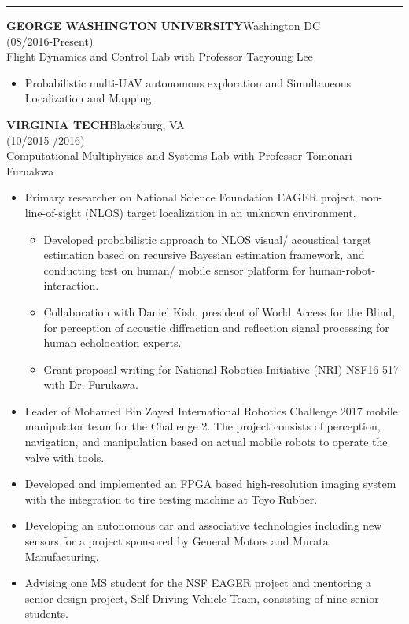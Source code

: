 \documentclass[11pt,letterpaper]{article}
\newcommand{\sect}[1]{\vspace{8mm}{\centering {\bf \large \scshape \uppercase{#1}} \par}  {\color{blue} \vskip 2mm \hrule height 1pt}\vspace{2mm}}
\begin{document}
  \sect{appointments}
  \MakeUppercase{\bf George Washington University}\hfill{Washington DC}\\
  \hfill {(08/2016-Present)}\\
  Flight Dynamics and Control Lab with Professor Taeyoung Lee\\
  \begin{itemize}
    \item Probabilistic multi-UAV autonomous exploration and Simultaneous Localization and Mapping.
  \end{itemize}
  \MakeUppercase{\bf Virginia Tech}\hfill{Blacksburg, VA }\\
  \hfill {(10/2015 /2016)}\\
  Computational Multiphysics and Systems Lab with Professor Tomonari Furuakwa\\
  \begin{itemize}
  	\item Primary researcher on National Science Foundation EAGER project, non-line-of-sight (NLOS) target localization in an unknown environment.
  	\begin{itemize}
  		\item Developed probabilistic approach to NLOS visual/ acoustical target estimation based on recursive Bayesian estimation framework, and conducting test on human/ mobile sensor platform for human-robot-interaction.
  		\item Collaboration with Daniel Kish, president of World Access for the Blind, for perception of acoustic diffraction and reflection signal processing for human echolocation experts.
  		\item Grant proposal writing for National Robotics Initiative (NRI) NSF16-517 with Dr. Furukawa.
  	\end{itemize}
  	\item Leader of Mohamed Bin Zayed International Robotics Challenge 2017 mobile manipulator team for the Challenge 2. The project consists of perception, navigation, and manipulation based on actual mobile robots to operate the valve with tools.
  	\item Developed and implemented an FPGA based high-resolution imaging system with the integration to tire testing machine at Toyo Rubber.
  	\item Developing an autonomous car and associative technologies including new sensors for a project sponsored by General Motors and Murata Manufacturing. \item Advising one MS student for the NSF EAGER project and mentoring a senior design project, Self-Driving Vehicle Team, consisting of nine senior students.
  \end{itemize}
\end{document}
